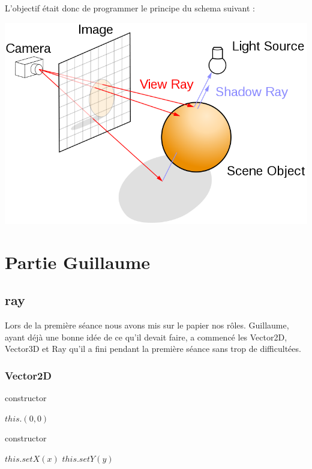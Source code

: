 \documentclass[a4paper,12pt]{article} %
\begin{document}
L'objectif était donc de programmer le principe du schema suivant :

\vspace*{1em}

\includegraphics[scale = 0.5]{raytracing.png}

\newpage

\section{Partie Guillaume}

\subsection{ray}

Lors de la première séance nous avons mis sur le papier nos rôles.
Guillaume, ayant déjà une bonne idée de ce qu'il devait faire, a commencé les Vector2D, Vector3D et Ray qu'il a fini pendant la première séance sans trop de difficultées.

\subsubsection{Vector2D}

\begin{algorithm}
    \caption{constructor}\label{Vector2D:constructor1}
    $this.(0, 0)$\;
\end{algorithm}

\begin{algorithm}
    \caption{constructor}\label{Vector2D:constructor2}
    $this.setX(x)$\;
    $this.setY(y)$\;
\end{algorithm}
\end{document}

